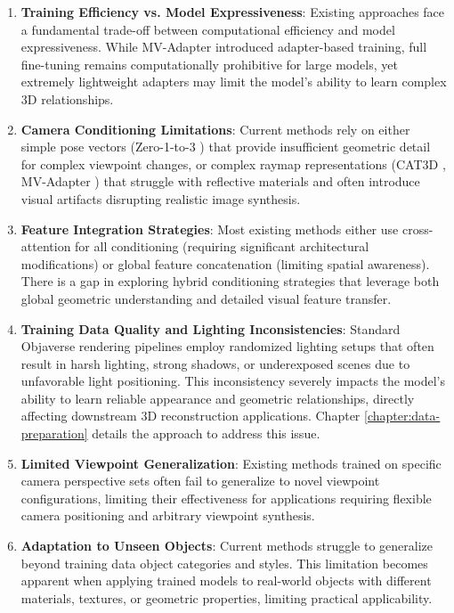 \begin{enumerate}
  \item \textbf{Training Efficiency vs. Model Expressiveness}: Existing approaches face a fundamental trade-off between computational efficiency and model expressiveness. While MV-Adapter \cite{mvadapter} introduced adapter-based training, full fine-tuning remains computationally prohibitive for large models, yet extremely lightweight adapters may limit the model's ability to learn complex 3D relationships.

  \item \textbf{Camera Conditioning Limitations}: Current methods rely on either simple pose vectors (Zero-1-to-3 \cite{zero1to3}) that provide insufficient geometric detail for complex viewpoint changes, or complex raymap representations (CAT3D \cite{cat3d}, MV-Adapter \cite{mvadapter}) that struggle with reflective materials and often introduce visual artifacts disrupting realistic image synthesis.

  \item \textbf{Feature Integration Strategies}: Most existing methods either use cross-attention for all conditioning (requiring significant architectural modifications) or global feature concatenation (limiting spatial awareness). There is a gap in exploring hybrid conditioning strategies that leverage both global geometric understanding and detailed visual feature transfer.

  \item \textbf{Training Data Quality and Lighting Inconsistencies}: Standard Objaverse rendering pipelines employ randomized lighting setups that often result in harsh lighting, strong shadows, or underexposed scenes due to unfavorable light positioning. This inconsistency severely impacts the model's ability to learn reliable appearance and geometric relationships, directly affecting downstream 3D reconstruction applications. Chapter \ref{chapter:data-preparation} details the approach to address this issue.

  \item \textbf{Limited Viewpoint Generalization}: Existing methods trained on specific camera perspective sets often fail to generalize to novel viewpoint configurations, limiting their effectiveness for applications requiring flexible camera positioning and arbitrary viewpoint synthesis.

  \item \textbf{Adaptation to Unseen Objects}: Current methods struggle to generalize beyond training data object categories and styles. This limitation becomes apparent when applying trained models to real-world objects with different materials, textures, or geometric properties, limiting practical applicability.

\end{enumerate}

